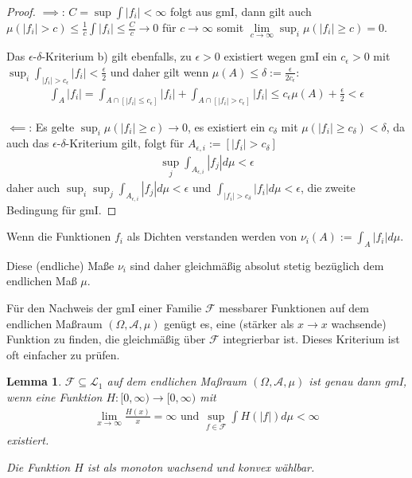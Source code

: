 \documentclass[]{article}
\newtheorem{lemma}{Lemma}
\begin{document}
\begin{proof}
	$\implies$: $C=\sup\int |f_i| < \infty$ folgt aus gmI, dann gilt auch $\mu(|f_i| > c)\leq \frac{1}{c} \int |f_i| \leq \frac{C}{c} \rightarrow 0$ für $c\rightarrow\infty$ somit $\lim\limits_{c\rightarrow\infty} \sup_i \mu(|f_i| \geq c) = 0$.
	
	Das $\epsilon$-$\delta$-Kriterium b) gilt ebenfalls, zu $\epsilon > 0$ existiert wegen gmI ein $c_\epsilon > 0$ mit $\sup_i \int_{|f_i|>c_\epsilon} |f_i| < \frac{\epsilon}{2}$ und daher gilt wenn $\mu(A)\leq \delta := \frac{\epsilon}{2 c_\epsilon}$:
	\begin{align*}
		\int_A |f_i| = \int_{A\cap[|f_i|\leq c_\epsilon]} |f_i| + \int_{A\cap[|f_i|> c_\epsilon]} |f_i| \leq c_\epsilon \mu(A) + \frac{\epsilon}{2} < \epsilon
	\end{align*}

	$\impliedby$: Es gelte $\sup_i \mu(|f_i| \geq c)\rightarrow 0$, es existiert ein $c_\delta$ mit $\mu(|f_i| \geq c_\delta) < \delta$, da auch das $\epsilon$-$\delta$-Kriterium gilt, folgt für $A_{\epsilon,i}:=[|f_i|>c_\delta]$
	\begin{align*}
		\sup_j \int_{A_{\epsilon, i}} |f_j| d\mu < \epsilon
	\end{align*}
	daher auch $\sup_i\sup_j \int_{A_{\epsilon, i}} |f_j| d\mu < \epsilon$ und $\int_{|f_i| > c_\delta} |f_i| d\mu < \epsilon$, die zweite Bedingung für gmI.
\end{proof}

Wenn die Funktionen $f_i$ als Dichten verstanden werden von $\nu_i(A) := \int_A |f_i| d\mu$.

Diese (endliche) Maße $\nu_i$ sind daher gleichmäßig absolut stetig bezüglich dem endlichen Maß $\mu$.

Für den Nachweis der gmI einer Familie $\mathcal{F}$ messbarer Funktionen auf dem endlichen Maßraum $(\Omega, \mathcal{A}, \mu)$ genügt es, eine (stärker als $x\rightarrow x$ wachsende) Funktion zu finden, die gleichmäßig über $\mathcal{F}$ integrierbar ist. Dieses Kriterium ist oft einfacher zu prüfen.

\begin{lemma}
	$\mathcal{F} \subseteq \mathcal{L}_1$ auf dem endlichen Maßraum $(\Omega, \mathcal{A}, \mu)$ ist genau dann gmI, wenn eine Funktion $H:[0, \infty) \rightarrow [0, \infty)$ mit
	\begin{align*}
		\lim_{x\rightarrow\infty} \frac{H(x)}{x} = \infty \text{ und } \sup_{f\in\mathcal{F}} \int H(|f|) d\mu < \infty
	\end{align*}
	existiert.
	
	Die Funktion $H$ ist als monoton wachsend und konvex wählbar.
\end{lemma}
\end{document}
